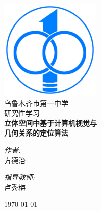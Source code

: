 \begin{titlepage}
\begin{center}
\includegraphics[scale=0.5]{./logo.png}\\[1cm] 
\textsc{\LARGE 乌鲁木齐市第一中学}\\[1.5cm]
\textsc{\Large 研究性学习}\\[0.5cm]
{ \huge \bfseries 立体空间中基于计算机视觉与\\几何关系的定位算法}\\[0.4cm]


\begin{minipage}{0.4\textwidth}
\begin{flushleft} \large
\begin{center}
\emph{作者:}\\
方德治
\end{center}
\end{flushleft}
\end{minipage}
\begin{minipage}{0.4\textwidth}
\begin{flushright} \large
\begin{center}
\emph{指导教师:} \\
卢秀梅
\end{center}
\end{flushright}
\end{minipage}

\vfill

{\large \today}

\end{center}
\end{titlepage}